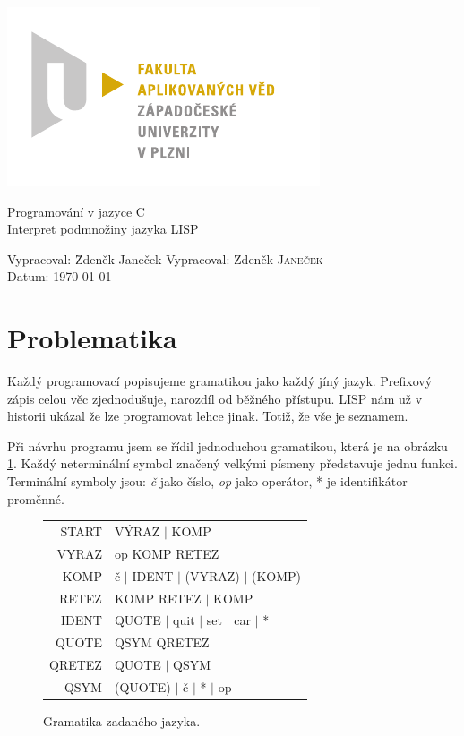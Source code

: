 \documentclass{article}
\begin{document}
\begin{titlepage}
\includegraphics[width=30ex]{fav_cmyk}
\vfill
\begin{center}
{\huge Programování v jazyce C}\\[2ex]
{\Large Interpret podmnožiny jazyka LISP}
\end{center}
\vfill
\begin{tabbing}
Vypracoval: \hspace{1ex}\=Zdeněk Janeček\kill
Vypracoval: \>Zdeněk \textsc{Janeček}\\
Datum:\> \today
\end{tabbing}
\end{titlepage}

\section{Problematika}
Každý programovací popisujeme gramatikou jako každý jíný jazyk.
Prefixový zápis celou věc zjednodušuje, narozdíl od běžného přístupu.
LISP nám už v historii ukázal že lze programovat lehce jinak.  Totiž,
že vše je seznamem.

Při návrhu programu jsem se řídil jednoduchou gramatikou, která je na
obrázku \ref{fig:gram}. Každý neterminální symbol značený velkými
písmeny představuje jednu funkci. Terminální symboly jsou: \emph{č}
jako číslo, \emph{op} jako operátor, * je identifikátor proměnné.

\begin{figure}
\centering
\begin{tabular}{r@{$\quad\longrightarrow\quad$}l}
START & VÝRAZ $|$ KOMP\\
VYRAZ & op KOMP RETEZ\\
KOMP & č $|$ IDENT $|$ (VYRAZ) $|$ (KOMP)\\
RETEZ & KOMP RETEZ $|$ KOMP\\
IDENT & QUOTE $|$ quit $|$ set $|$ car $|$ *\\[1ex]
QUOTE & QSYM QRETEZ\\
QRETEZ & QUOTE $|$ QSYM\\
QSYM & (QUOTE) $|$ č $|$ * $|$ op
\end{tabular}

\caption{Gramatika zadaného jazyka.}
\label{fig:gram}
\end{figure}
\end{document}
